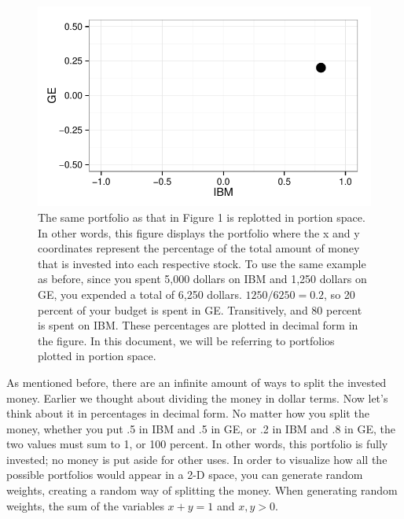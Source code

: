 \documentclass{article}\usepackage{graphicx, color}
\makeatletter
\def\maxwidth{ %
  \ifdim\Gin@nat@width>\linewidth
    \linewidth
  \else
    \Gin@nat@width
  \fi
}
\newenvironment{knitrout}{}{} %
\makeatother
\begin{document}
\begin{figure}[H]
\begin{knitrout}
\color{fgcolor}
\includegraphics[width=\maxwidth]{figure/figure2} 

\end{knitrout}

\caption{The same portfolio as that in Figure 1 is replotted in portion space. In other words, this figure displays the portfolio where the x and y coordinates represent the percentage of the total amount of money that is invested into each respective stock. To use the same example as before, since you spent 5,000 dollars on IBM and 1,250 dollars on GE, you expended a total of 6,250 dollars. $1250/6250 = 0.2$, so 20 percent of your budget is spent in GE. Transitively, and 80 percent is spent on IBM. These percentages are plotted in decimal form in the figure. In this document, we will be referring to portfolios plotted in portion space.}
\end{figure}

As mentioned before, there are an infinite amount of ways to split the invested money. Earlier we thought about dividing the money in dollar terms. Now let's think about it in percentages in decimal form. No matter how you split the money, whether you put .5 in IBM and .5 in GE, or .2 in IBM and .8 in GE, the two values must sum to 1, or 100 percent. In other words, this portfolio is fully invested; no money is put aside for other uses.
In order to visualize how all the possible portfolios would appear in a 2-D space, you can generate random weights, creating a random way of splitting the money. When generating random weights, the sum of the variables $x + y = 1$ and ${x, y} > 0$.
\end{document}
